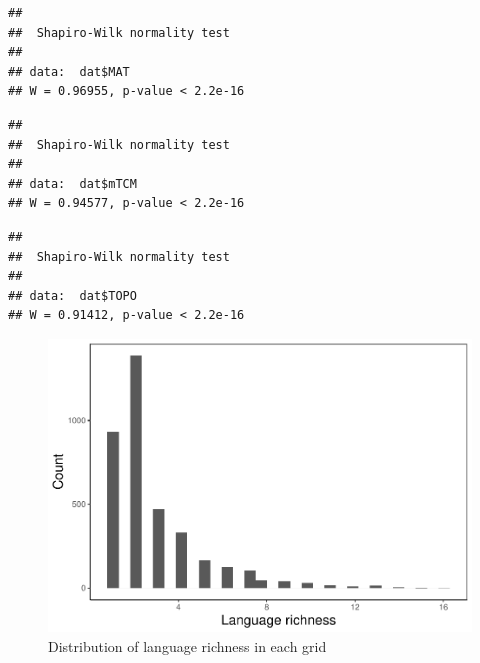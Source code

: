 \documentclass[12pt,]{article}
\newenvironment{Shaded}{\begin{snugshade}}{\end{snugshade}}
\newcommand{\KeywordTok}[1]{\textcolor[rgb]{0.13,0.29,0.53}{\textbf{#1}}}
\newcommand{\OperatorTok}[1]{\textcolor[rgb]{0.81,0.36,0.00}{\textbf{#1}}}
\newcommand{\NormalTok}[1]{#1}
\begin{document}
\begin{verbatim}
## 
##  Shapiro-Wilk normality test
## 
## data:  dat$MAT
## W = 0.96955, p-value < 2.2e-16
\end{verbatim}

\begin{Shaded}
\end{Shaded}

\begin{verbatim}
## 
##  Shapiro-Wilk normality test
## 
## data:  dat$mTCM
## W = 0.94577, p-value < 2.2e-16
\end{verbatim}

\begin{Shaded}
\end{Shaded}

\begin{verbatim}
## 
##  Shapiro-Wilk normality test
## 
## data:  dat$TOPO
## W = 0.91412, p-value < 2.2e-16
\end{verbatim}

\begin{figure}
\centering
\includegraphics{Project_Template_files/figure-latex/unnamed-chunk-2-1.pdf}
\caption{Distribution of language richness in each grid}
\end{figure}
\end{document}
